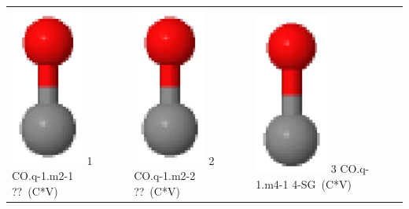 \documentclass[10pt]{article}
\begin{document}
\vspace{0.5cm}
\begin{tabular}{|
>{\centering\arraybackslash}p{2.40000000000000000000cm}|
>{\centering\arraybackslash}p{2.40000000000000000000cm}|
>{\centering\arraybackslash}p{2.40000000000000000000cm}|
>{\centering\arraybackslash}p{2.40000000000000000000cm}|
>{\centering\arraybackslash}p{2.40000000000000000000cm}|
}
\hline
\multicolumn{4}{|c|}{CO} \\\hline
\includegraphics[width=2.40000000000000000000cm]{CO.q-1.m2-1.eps} \tiny{1 \hspace{1.20000000000000000000cm} CO.q-1.m2-1 \hspace{5pt} ??~(C*V)} &
\includegraphics[width=2.40000000000000000000cm]{CO.q-1.m2-2.eps} \tiny{2 \hspace{1.20000000000000000000cm} CO.q-1.m2-2 \hspace{5pt} ??~(C*V)} &
\includegraphics[width=2.40000000000000000000cm]{CO.q-1.m4-1.eps} \tiny{3 \hspace{1.20000000000000000000cm} CO.q-1.m4-1 \hspace{5pt} 4-SG~(C*V)} &

\end{tabular}
\end{document}
